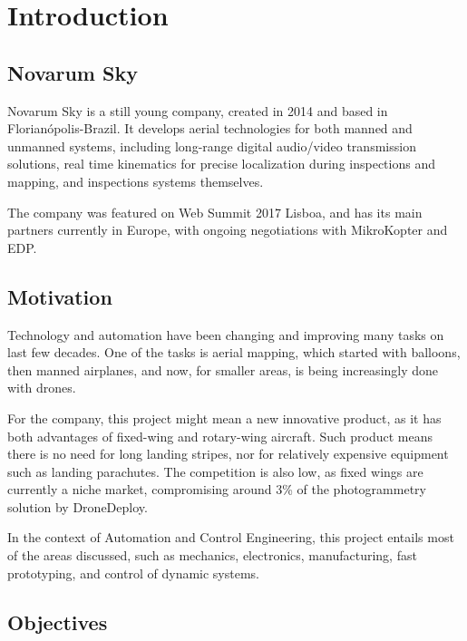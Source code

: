 

\chapter{Introduction} \label{chap:Introduction}


\section{Novarum Sky}
	Novarum Sky is a still young company, created in 2014 and based in Florianópolis-Brazil. It develops aerial technologies for both manned and unmanned systems, including long-range digital audio/video transmission solutions, real time kinematics for precise localization during inspections and mapping, and inspections systems themselves.

The company was featured on Web Summit 2017 Lisboa, and has its main partners currently in Europe, with ongoing negotiations with MikroKopter and EDP.

\section{Motivation}
Technology and automation have been changing and improving many tasks on last few decades.
%
One of the tasks is aerial mapping, which started with balloons, then manned airplanes, and now, for smaller areas, is being increasingly done with drones\cite{dronesontherise}.
%

For the company, this project might mean a new innovative product, as it has both advantages of fixed-wing and rotary-wing aircraft.
Such product means there is no need for long landing stripes, nor for relatively expensive equipment such as landing parachutes. The competition is also low, as fixed wings are currently a niche market, compromising around 3\% of the photogrammetry solution by DroneDeploy\cite{dronedeployreport}.
%

In the context of Automation and Control Engineering, this project entails most of the areas discussed, such as mechanics, electronics, manufacturing, fast prototyping, and control of dynamic systems.
%	


\section{Objectives}

